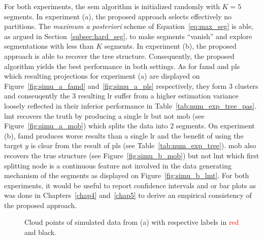 For both experiments, the \gls{sem} algorithm is initialized randomly with $K = 5$ segments. In experiment (a), the proposed approach selects effectively no partitions. The \textit{maximum a posteriori} scheme of Equation~\eqref{eq:max_seg} is able, as argued in Section~\ref{subsec:hard_seg}, to make segments ``vanish'' and explore segmentations with less than $K$ segments. In experiment (b), the proposed approach is able to recover the tree structure. Consequently, the proposed algorithm yields the best performance in both settings. As for \gls{famd} and \gls{pls} which resulting projections for experiment (a) are displayed on Figure~\ref{fig:simu_a_famd} and~\ref{fig:simu_a_pls} respectively, they form $3$ clusters and conseuqently the $3$ resulting \gls{lr} suffer from a higher estimation variance loosely reflected in their inferior performance in Table~\ref{tab:num_exp_tree_pas}. \gls{lmt} recovers the truth by producing a single \gls{lr} but not \gls{mob} (see Figure~\ref{fig:simu_a_mob}) which splits the data into $2$ segments. On experiment (b), \gls{famd} produces worse results than a single \gls{lr} and the benefit of using the target $y$ is clear from the result of \gls{pls} (see Table~\ref{tab:num_exp_tree}). \gls{mob} also recovers the true structure (see Figure~\ref{fig:simu_b_mob}) but not \gls{lmt} which first splitting node is a continuous feature not involved in the data generating mechanism of the segments as displayed on Figure~\ref{fig:simu_b_lmt}. For both experiments, it would be useful to report confidence intervals and or bar plots as was done in Chapters~\ref{chap4} and~\ref{chap5} to derive an empirical consistency of the proposed approach.

\begin{figure}
\centering \resizebox{.7\textwidth}{!}{}
\caption{Cloud points of simulated data from (a) with respective labels in \textcolor{red}{red} and black.}
\label{fig:simu_pas}
\end{figure}


